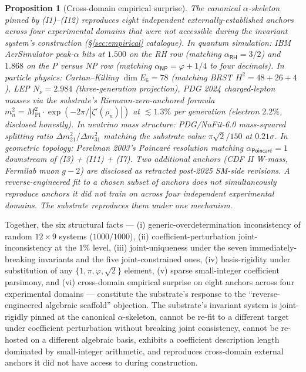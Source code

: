 \documentclass[11pt,a4paper]{amsart}
\theoremstyle{plain}
\newtheorem{proposition}[theorem]{Proposition}
\theoremstyle{definition}
\begin{document}
\begin{proposition}[Cross-domain empirical surprise]\label{prop:cross-domain-surprise}
The canonical $\alpha$-skeleton pinned by \textup{(I1)--(I12)} reproduces eight independent externally-established anchors across four experimental domains that were not accessible during the invariant system's construction (\S\ref{sec:empirical} catalogue). In quantum simulation: IBM AerSimulator peak-$\alpha$ hits at $1.500$ on the RH row (matching $\alpha_{\textsf{RH}} = 3/2$) and $1.868$ on the P versus NP row (matching $\alpha_{\textsf{NP}} = \varphi + 1/4$ to four decimals). In particle physics: Cartan--Killing $\dim E_{6} = 78$ (matching BRST $H^{2} = 48 + 26 + 4$), LEP $N_{\nu} = 2.984$ (three-generation projection), PDG 2024 charged-lepton masses via the substrate's Riemann-zero-anchored formula $m_{n}^{2} = M_{\mathrm{Pl}}^{2} \cdot \exp(-2\pi/|\zeta'(\rho_{n})|)$ at $\lesssim 1.3\%$ per generation (electron $2.2\%$, disclosed honestly). In neutrino mass structure: PDG/NuFit-6.0 mass-squared splitting ratio $\Delta m^{2}_{21}/\Delta m^{2}_{31}$ matching the substrate value $\pi\sqrt{2}/150$ at $0.21\sigma$. In geometric topology: Perelman 2003's Poincar\'e resolution matching $\alpha_{\textsf{Poincar\'e}} = 1$ downstream of (I3) + (I11) + (I7). Two additional anchors (CDF II W-mass, Fermilab muon $g-2$) are disclosed as retracted post-2025 SM-side revisions. A reverse-engineered fit to a chosen subset of anchors does not simultaneously reproduce anchors it did not train on across four independent experimental domains. The substrate reproduces them under one mechanism.
\end{proposition}

Together, the six structural facts --- (i) generic-overdetermination inconsistency of random $12 \times 9$ systems ($1000/1000$), (ii) coefficient-perturbation joint-inconsistency at the $1\%$ level, (iii) joint-uniqueness under the seven immediately-breaking invariants and the five joint-constrained ones, (iv) basis-rigidity under substitution of any $\{1, \pi, \varphi, \sqrt{2}\}$ element, (v) sparse small-integer coefficient parsimony, and (vi) cross-domain empirical surprise on eight anchors across four experimental domains --- constitute the substrate's response to the ``reverse-engineered algebraic scaffold'' objection. The substrate's invariant system is joint-rigidly pinned at the canonical $\alpha$-skeleton, cannot be re-fit to a different target under coefficient perturbation without breaking joint consistency, cannot be re-hosted on a different algebraic basis, exhibits a coefficient description length dominated by small-integer arithmetic, and reproduces cross-domain external anchors it did not have access to during construction.
\end{document}
